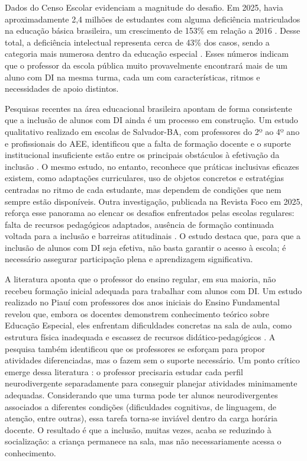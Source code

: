 Dados do Censo Escolar evidenciam a magnitude do desafio. Em 2025, havia aproximadamente 2,4 milhões de estudantes com alguma deficiência matriculados na educação básica brasileira, um crescimento de 153\% em relação a 2016 \cite{inep2025censo}. Desse total, a deficiência intelectual representa cerca de 43\% dos casos, sendo a categoria mais numerosa dentro da educação especial \cite{inep2025censo}. Esses números indicam que o professor da escola pública muito provavelmente encontrará mais de um aluno com DI na mesma turma, cada um com características, ritmos e necessidades de apoio distintos.

Pesquisas recentes na área educacional brasileira apontam de forma consistente que a inclusão de alunos com DI ainda é um processo em construção. Um estudo qualitativo realizado em escolas de Salvador-BA, com professores do 2º ao 4º ano e profissionais do AEE, identificou que a falta de formação docente e o suporte institucional insuficiente estão entre os principais obstáculos à efetivação da inclusão \cite{souza2025acessibilidade}. O mesmo estudo, no entanto, reconhece que práticas inclusivas eficazes existem, como adaptações curriculares, uso de objetos concretos e estratégias centradas no ritmo de cada estudante, mas dependem de condições que nem sempre estão disponíveis. Outra investigação, publicada na Revista Foco em 2025, reforça esse panorama ao elencar os desafios enfrentados pelas escolas regulares: falta de recursos pedagógicos adaptados, ausência de formação continuada voltada para a inclusão e barreiras atitudinais \cite{oliveira2025escolas}. O estudo destaca que, para que a inclusão de alunos com DI seja efetiva, não basta garantir o acesso à escola; é necessário assegurar participação plena e aprendizagem significativa.

A literatura aponta que o professor do ensino regular, em sua maioria, não recebeu formação inicial adequada para trabalhar com alunos com DI. Um estudo realizado no Piauí com professores dos anos iniciais do Ensino Fundamental revelou que, embora os docentes demonstrem conhecimento teórico sobre Educação Especial, eles enfrentam dificuldades concretas na sala de aula, como estrutura física inadequada e escassez de recursos didático-pedagógicos \cite{oliveira2025escolas}. A pesquisa também identificou que os professores se esforçam para propor atividades diferenciadas, mas o fazem sem o suporte necessário. Um ponto crítico emerge dessa literatura \cite{oliveira2025escolas}: o professor precisaria estudar cada perfil neurodivergente separadamente para conseguir planejar atividades minimamente adequadas. Considerando que uma turma pode ter alunos neurodivergentes associados a diferentes condições (dificuldades cognitivas, de linguagem, de atenção, entre outras), essa tarefa torna-se inviável dentro da carga horária docente. O resultado é que a inclusão, muitas vezes, acaba se reduzindo à socialização: a criança permanece na sala, mas não necessariamente acessa o conhecimento.

